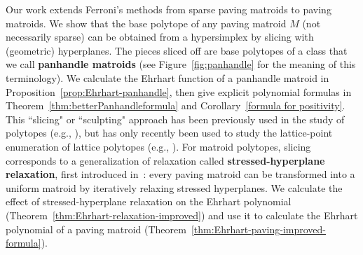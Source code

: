 \documentclass[11pt]{amsart}
\theoremstyle{definition}
\newcommand{\0}{\emptyset}
\newcommand{\defterm}[1]{\textbf{#1}}
\newcommand{\andres}[1]{\par \noindent
  \framebox{\begin{minipage}[c]{0.95 \textwidth}\color{blue} Andr\'es Note:
      #1 \end{minipage}\color{black}}\par}
\newcommand{\JLM}[1]{\par \noindent
  \framebox{\begin{minipage}[c]{0.95 \textwidth}\color{blue} Jeremy Note:
      #1 \end{minipage}\color{blue}}\par}
\newcommand{\MY}[1]{\par \noindent
  \framebox{\begin{minipage}[c]{0.95 \textwidth}\color{orange} Mei Note:
      #1 \end{minipage}\color{red}}\par}
\newcommand{\GDN}[1]{\par \noindent
  \framebox{\begin{minipage}[c]{0.95 \textwidth}\color{purple} George Note:
      #1 \end{minipage}\color{purple}}\par}
\begin{document}
Our work extends Ferroni's methods from sparse paving matroids to paving matroids. 
We show that the base polytope of any paving matroid $M$ (not necessarily sparse) can be obtained from a hypersimplex by slicing with (geometric) hyperplanes.
The pieces sliced off are base polytopes of a class that we call \defterm{panhandle matroids} (see Figure~\ref{fig:panhandle} for the meaning of this terminology).  We calculate the Ehrhart function of a panhandle matroid in Proposition~\ref{prop:Ehrhart-panhandle}, then give explicit polynomial formulas in Theorem~\ref{thm:betterPanhandleformula} and Corollary~\ref{formula for positivity}.
This ``slicing" or ``sculpting" approach has been previously used in the study of polytopes (e.g., \cite{HerrmaannJoswig, JoswigSchroter, Kim}), but has only recently been used to study the lattice-point enumeration of lattice polytopes (e.g., \cite{FerroniMcGinnis, FerroniJochemkSchroter, FerroniSchroter}).
For matroid polytopes, slicing corresponds to a generalization of relaxation called \defterm{stressed-hyperplane relaxation}, first introduced in~\cite{relaxation}: every paving matroid can be transformed into a uniform matroid by iteratively relaxing stressed hyperplanes.
We calculate the effect of stressed-hyperplane relaxation on the Ehrhart polynomial (Theorem~\ref{thm:Ehrhart-relaxation-improved}) and use it to calculate the Ehrhart polynomial of a paving matroid (Theorem~\ref{thm:Ehrhart-paving-improved-formula}).
\end{document}
